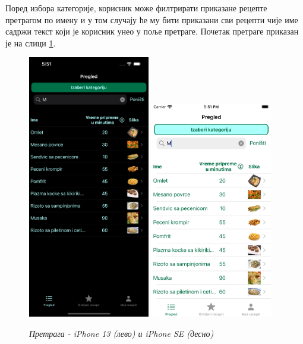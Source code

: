 \documentclass[12pt,oneside]{memoir}
\begin{document}
\indent Поред избора категорије, корисник може филтрирати приказане рецепте претрагом по имену и у том случају ће му бити приказани сви рецепти чије име садржи текст који је корисник унео у поље претраге. Почетак претраге приказан је на слици \ref{slika:претрага_1}.

\begin{figure} [H]
    \centering
    \captionsetup{justification=centering}
    \includegraphics[width=0.475\textwidth]{images/simulators/view images/dark - search.png} 
    \hfill
    \includegraphics[width=0.475\textwidth]{images/simulators/view images/light - search.png} 
    \caption{\textit{Претрага - iPhone 13 (лево) и iPhone SE (десно)}}
    \label{slika:претрага_1}
\end{figure}
\end{document}
